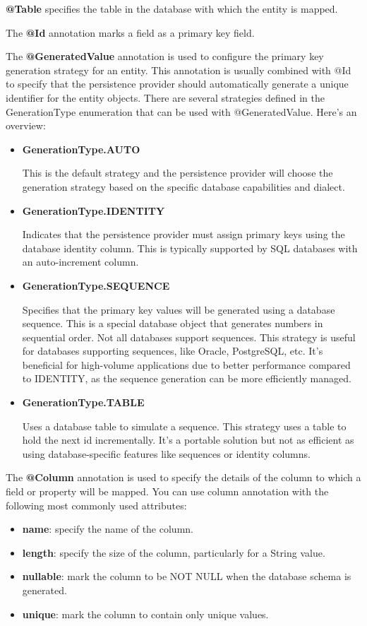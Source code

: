 \textbf{@Table} specifies the table in the database with which the entity is mapped.

The \textbf{@Id} annotation marks a field as a primary key field.

The \textbf{@GeneratedValue} annotation is used to configure the primary key generation strategy for an entity. This annotation is usually combined with @Id to specify that the persistence provider should automatically generate a unique identifier for the entity objects. There are several strategies defined in the GenerationType enumeration that can be used with @GeneratedValue. Here's an overview:

\begin{itemize}
\item \textbf{GenerationType.AUTO}

This is the default strategy and the persistence provider will choose the generation strategy based on the specific database capabilities and dialect. 

\item \textbf{GenerationType.IDENTITY}

Indicates that the persistence provider must assign primary keys using the database identity column. This is typically supported by SQL databases with an auto-increment column.

\item \textbf{GenerationType.SEQUENCE}

Specifies that the primary key values will be generated using a database sequence. This is a special database object that generates numbers in sequential order. Not all databases support sequences.
This strategy is useful for databases supporting sequences, like Oracle, PostgreSQL, etc. It's beneficial for high-volume applications due to better performance compared to IDENTITY, as the sequence generation can be more efficiently managed.

\item \textbf{GenerationType.TABLE}

Uses a database table to simulate a sequence. This strategy uses a table to hold the next id incrementally. It's a portable solution but not as efficient as using database-specific features like sequences or identity columns.
\end{itemize}

The \textbf{@Column} annotation is used to specify the details of the column to which a field or property will be mapped. You can use column annotation with the following most commonly used attributes:
\begin{itemize}
\item \textbf{name}: specify the name of the column.
\item \textbf{length}: specify the size of the column, particularly for a String value.
\item \textbf{nullable}: mark the column to be NOT NULL when the database schema is generated.
\item \textbf{unique}: mark the column to contain only unique values.
\end{itemize}


